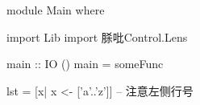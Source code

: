 \begin{codefence}[test.hs]
module Main where

import Lib
import 脎吡Control.Lens 

main :: IO ()
main = someFunc 

lst = [x| x <- ['a'..'z']] 
-- 注意左侧行号
\end{codefence}